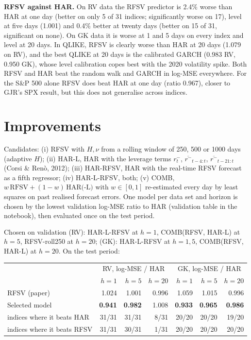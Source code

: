 \documentclass[11pt,a4paper]{article}
\begin{document}
\textbf{RFSV against HAR.} On RV data the RFSV predictor is 2.4\% worse than HAR at one day (better on only 5 of 31
indices; significantly worse on 17), level at five days (1.001) and 0.4\% better at twenty days (better on 15 of 31,
significant on none). On GK data it is worse at 1 and 5 days on every index and level at 20 days. In QLIKE, RFSV is
clearly worse than HAR at 20 days (1.079 on RV), and the best QLIKE at 20 days is the calibrated GARCH
(0.983 RV, 0.950 GK), whose level calibration copes best with the 2020 volatility spike. Both RFSV and HAR beat the
random walk and GARCH in log-MSE everywhere. For the S\&P 500 alone RFSV does beat HAR at one day (ratio 0.967),
closer to GJR's SPX result, but this does not generalise across indices.

\begin{table}[h]
\centering\footnotesize

\caption{Diebold--Mariano tests on the test period: number of indices (of 31 RV, 20 GK) where A is
significantly better / worse than B at 5\%.}
\label{tab:dm}
\end{table}

\section{Improvements}
Candidates: (i) RFSV with $H,\nu$ from a rolling window of 250, 500 or 1000 days (adaptive $H$);
(ii) HAR-L, HAR with the leverage terms $r_t^-$, $\overline{r^-}_{t-4:t}$, $\overline{r^-}_{t-21:t}$ (Corsi \& Ren\`o, 2012);
(iii) HAR-RFSV, HAR with the real-time RFSV forecast as a fifth regressor; (iv) HAR-L-RFSV, both;
(v) COMB, $w\,\text{RFSV}+(1-w)\,\text{HAR(-L)}$ with $w\in[0,1]$ re-estimated every day by least squares on past
realised forecast errors. One model per data set and horizon is chosen by the lowest validation log-MSE ratio to HAR
(validation table in the notebook), then evaluated once on the test period.

Chosen on validation (RV): HAR-L-RFSV at $h=1$, COMB(RFSV, HAR-L) at $h=5$, RFSV-roll250 at $h=20$;
(GK): HAR-L-RFSV at $h=1,5$, COMB(RFSV, HAR-L) at $h=20$. On the test period:

\begin{center}\footnotesize
\begin{tabular}{lrrrrrr}
\toprule
& \multicolumn{3}{c}{RV, log-MSE / HAR} & \multicolumn{3}{c}{GK, log-MSE / HAR}\\
& $h=1$ & $h=5$ & $h=20$ & $h=1$ & $h=5$ & $h=20$\\
\midrule
RFSV (paper) & 1.024 & 1.001 & 0.996 & 1.059 & 1.015 & 0.996\\
Selected model & \textbf{0.941} & \textbf{0.982} & 1.008 & \textbf{0.933} & \textbf{0.965} & \textbf{0.986}\\
\quad indices where it beats HAR & 31/31 & 31/31 & 8/31 & 20/20 & 20/20 & 19/20\\
\quad indices where it beats RFSV & 31/31 & 30/31 & 1/31 & 20/20 & 20/20 & 20/20\\
\bottomrule
\end{tabular}
\end{center}
\end{document}
